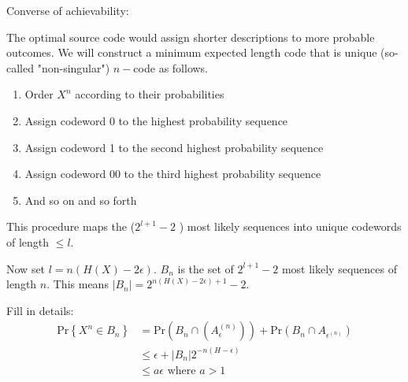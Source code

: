 Converse of achievability:

The optimal source code would assign shorter descriptions to more probable outcomes. We will construct a minimum expected length code that is unique (so-called "non-singular") \(n -\)code as follows.


\begin{enumerate}
    \item Order \(X^n\) according to their probabilities
    \item Assign codeword 0 to the highest probability sequence
    \item Assign codeword 1 to the second highest probability sequence
    \item Assign codeword 00 to the third highest probability sequence
    \item And so on and so forth 
\end{enumerate}

\noindent This procedure maps the (\(2^{l + 1} - 2\) ) most likely sequences into unique codewords of length \( \leq l\). 

Now set \( l = n(H(X) - 2\epsilon )\). \(B_{n} \) is the set of \(2^{l + 1}- 2\) most likely sequences of length \(n\). This means \(\left\lvert B_{n}  \right\rvert  = 2^{n(H(X) - 2\epsilon ) + 1} - 2\).

Fill in details:
\begin{align*}
    \mathrm{Pr} \left\{ X^n \in  B_{n}  \right\} &= \mathrm{Pr} (B_{n} \cap (A_{\epsilon } ^{(n)})) + \mathrm{Pr} (B_{n} \cap A_{\epsilon ^{(n)}} ) \\
    &\leq \epsilon  + \left\lvert B_{n}  \right\rvert 2^{- n(H - \epsilon )} \\
    &\leq a \epsilon \text{ where } a > 1
\end{align*}
